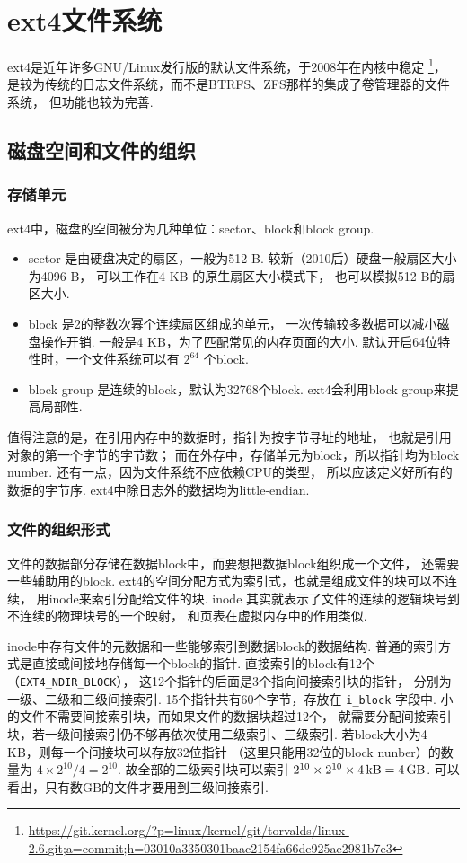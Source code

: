 \section{ext4文件系统}
ext4是近年许多GNU/Linux发行版的默认文件系统，于2008年在内核中稳定
\footnote{\url{https://git.kernel.org/?p=linux/kernel/git/torvalds/linux-2.6.git;a=commit;h=03010a3350301baac2154fa66de925ae2981b7e3}}，
是较为传统的日志文件系统，而不是BTRFS、ZFS那样的集成了卷管理器的文件系统，
但功能也较为完善.

\subsection{磁盘空间和文件的组织}
\subsubsection{存储单元} \label{fs units}
ext4中，磁盘的空间被分为几种单位：sector、block和block group.
\begin{itemize}
	\item sector 是由硬盘决定的扇区，一般为512 B.
	      较新（2010后）硬盘一般扇区大小为4096 B，
	      可以工作在4 KB 的原生扇区大小模式下，
	      也可以模拟512 B的扇区大小.
	\item block 是2的整数次幂个连续扇区组成的单元，
	      一次传输较多数据可以减小磁盘操作开销.
	      一般是4 KB，为了匹配常见的内存页面的大小.
	      默认开启64位特性时，一个文件系统可以有 $2^{64}$ 个block.
	\item block group 是连续的block，默认为32768个block. 
	      ext4会利用block group来提高局部性.
\end{itemize}
值得注意的是，在引用内存中的数据时，指针为按字节寻址的地址，
也就是引用对象的第一个字节的字节数；
而在外存中，存储单元为block，所以指针均为block number.
还有一点，因为文件系统不应依赖CPU的类型，
所以应该定义好所有的数据的字节序.
ext4中除日志外的数据均为little-endian.

\subsubsection{文件的组织形式}
文件的数据部分存储在数据block中，而要想把数据block组织成一个文件，
还需要一些辅助用的block.
ext4的空间分配方式为索引式，也就是组成文件的块可以不连续，
用inode来索引分配给文件的块.
inode 其实就表示了文件的连续的逻辑块号到不连续的物理块号的一个映射，
和页表在虚拟内存中的作用类似.

inode中存有文件的元数据和一些能够索引到数据block的数据结构.
普通的索引方式是直接或间接地存储每一个block的指针.
直接索引的block有12个（\lstinline{EXT4_NDIR_BLOCK}），
这12个指针的后面是3个指向间接索引块的指针，
分别为一级、二级和三级间接索引.
15个指针共有60个字节，存放在 \lstinline{i_block} 字段中.
小的文件不需要间接索引块，而如果文件的数据块超过12个，
就需要分配间接索引块，若一级间接索引仍不够再依次使用二级索引、三级索引.
若block大小为4 KB，则每一个间接块可以存放32位指针
（这里只能用32位的block nunber）的数量为 $4\times2^{10}/4 = 2^{10}$.
故全部的二级索引块可以索引 $2^{10}\times2^{10}\times\SI{4}{\kilo\byte} = \SI{4}{\giga\byte}$.
可以看出，只有数GB的文件才要用到三级间接索引.

